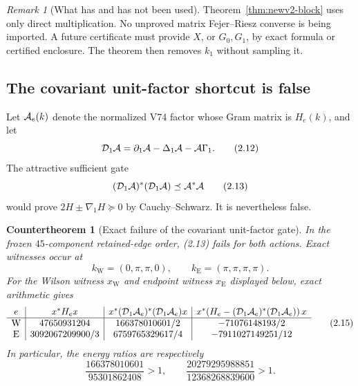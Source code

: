 \documentclass[11pt,oneside]{article}
\newtheorem{countertheorem}[theorem]{Countertheorem}
\theoremstyle{definition}
\theoremstyle{remark}
\newtheorem{remark}[theorem]{Remark}
\begin{document}
\begin{remark}[What has and has not been used]
\label{rem:newv2-fejer}
Theorem~\ref{thm:newv2-block} uses only direct multiplication.
No unproved matrix Fejer--Riesz converse is being imported.  A
future certificate must provide \(X\), or \(G_0,G_1\), by exact
formula or certified enclosure.  The theorem then removes \(k_1\)
without sampling it.
\end{remark}

\subsection{The covariant unit-factor shortcut is false}

Let \({\cal A}_e(k)\) denote the normalized V74 factor whose Gram
matrix is \(H_e(k)\), and let
\[
 {\cal D}_1{\cal A}
 =\partial_1{\cal A}-\Delta_1{\cal A}-{\cal A}\Gamma_1.   \tag{2.12}
\]
The attractive sufficient gate
\[
 ({\cal D}_1{\cal A})^*({\cal D}_1{\cal A})
 \preceq {\cal A}^*{\cal A}                              \tag{2.13}
\]
would prove \(2H\pm\nabla_1H\succeq0\) by Cauchy--Schwarz.
It is nevertheless false.

\begin{countertheorem}[Exact failure of the covariant unit-factor gate]
\label{ctr:newv2-factor}
In the frozen \(45\)-component retained-edge order, (2.13) fails
for both actions.  Exact witnesses occur at
\[
 k_{\mathrm W}=(0,\pi,\pi,0),\qquad
 k_{\mathrm E}=(\pi,\pi,\pi,\pi).                        \tag{2.14}
\]
For the Wilson witness \(x_{\mathrm W}\) and endpoint witness
\(x_{\mathrm E}\) displayed below, exact arithmetic gives
\[
\begin{array}{c|c|c|c}
e&x^*H_ex&
x^*({\cal D}_1{\cal A}_e)^*({\cal D}_1{\cal A}_e)x&
x^*\!\left(H_e-({\cal D}_1{\cal A}_e)^*
({\cal D}_1{\cal A}_e)\right)x\\ \hline
\mathrm W&47650931204&166378010601/2&-71076148193/2\\
\mathrm E&3092067209900/3&6759765329617/4&
-7911027149251/12
\end{array}                                                \tag{2.15}
\]
In particular, the energy ratios are respectively
\[
 \frac{166378010601}{95301862408}>1,\qquad
 \frac{20279295988851}{12368268839600}>1.                \tag{2.16}
\]
\end{countertheorem}
\end{document}

